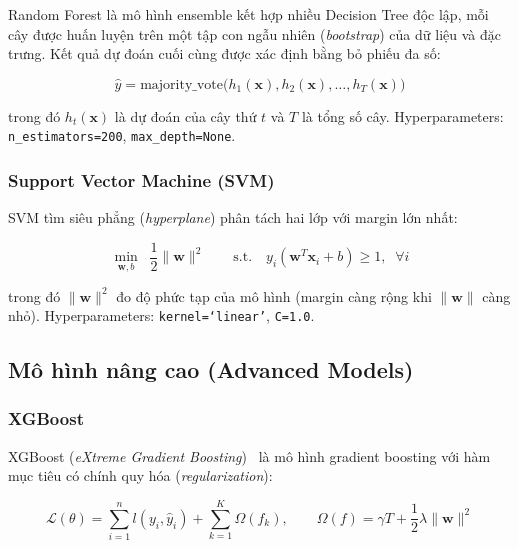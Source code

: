 Random Forest là mô hình ensemble kết hợp nhiều Decision Tree độc lập, mỗi cây được huấn luyện trên một tập con ngẫu nhiên (\textit{bootstrap}) của dữ liệu và đặc trưng. Kết quả dự đoán cuối cùng được xác định bằng bỏ phiếu đa số:

\begin{equation}
\hat{y} = \text{majority\_vote}\big(h_1(\mathbf{x}), h_2(\mathbf{x}), \ldots, h_T(\mathbf{x})\big)
\label{eq:rf}
\end{equation}

trong đó $h_t(\mathbf{x})$ là dự đoán của cây thứ $t$ và $T$ là tổng số cây. Hyperparameters: \texttt{n\_estimators=200}, \texttt{max\_depth=None}.

\subsubsection{Support Vector Machine (SVM)}

SVM tìm siêu phẳng (\textit{hyperplane}) phân tách hai lớp với margin lớn nhất:

\begin{equation}
\min_{\mathbf{w}, b} \;\; \frac{1}{2}\|\mathbf{w}\|^2 \qquad \text{s.t.} \quad y_i(\mathbf{w}^T\mathbf{x}_i + b) \geq 1, \;\; \forall i
\label{eq:svm}
\end{equation}

trong đó $\|\mathbf{w}\|^2$ đo độ phức tạp của mô hình (margin càng rộng khi $\|\mathbf{w}\|$ càng nhỏ). Hyperparameters: \texttt{kernel=`linear'}, \texttt{C=1.0}.

\subsection{Mô hình nâng cao (Advanced Models)}
\label{subsec:advanced_models}

\subsubsection{XGBoost}

XGBoost (\textit{eXtreme Gradient Boosting})~\cite{chen2016xgboost} là mô hình gradient boosting với hàm mục tiêu có chính quy hóa (\textit{regularization}):

\begin{equation}
\mathcal{L}(\theta) = \sum_{i=1}^{n} l(y_i, \hat{y}_i) + \sum_{k=1}^{K} \Omega(f_k), \qquad \Omega(f) = \gamma T + \frac{1}{2}\lambda\|\mathbf{w}\|^2
\label{eq:xgboost}
\end{equation}

